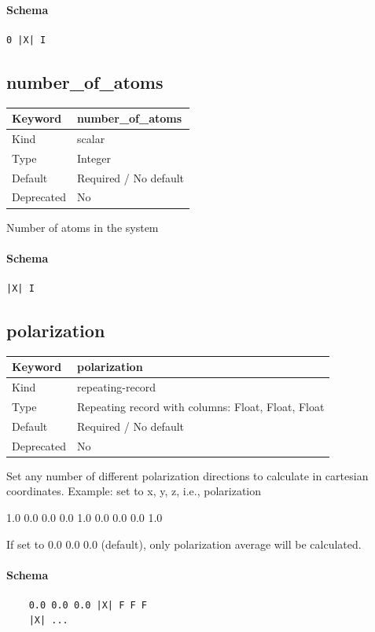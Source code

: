 \documentclass[11pt]{article}
\begin{document}
\paragraph{Schema}
\begin{Verbatim}
0 |X| I
\end{Verbatim}

\subsection{number\_of\_atoms}
\label{kw:number-of-atoms}
\begin{longtable}{|p{1.5in}|p{4.5in}|}
\hline
Keyword & number\_of\_atoms \\
\hline
Kind & scalar \\
\hline
Type & Integer \\
\hline
Default & Required / No default \\
\hline
Deprecated & No \\
\hline
\end{longtable}
 Number of atoms in the system

\paragraph{Schema}
\begin{Verbatim}
|X| I
\end{Verbatim}

\subsection{polarization}
\label{kw:polarization}
\begin{longtable}{|p{1.5in}|p{4.5in}|}
\hline
Keyword & polarization \\
\hline
Kind & repeating-record \\
\hline
Type & Repeating record with columns: Float, Float, Float \\
\hline
Default & Required / No default \\
\hline
Deprecated & No \\
\hline
\end{longtable}
 Set any number of different polarization directions to calculate in cartesian coordinates.
 Example: set to x, y, z, i.e.,
 polarization{
    1.0 0.0 0.0
    0.0 1.0 0.0
    0.0 0.0 1.0

 If set to 0.0 0.0 0.0 (default), only polarization average will be calculated.
}

\paragraph{Schema}
\begin{Verbatim}
    0.0 0.0 0.0 |X| F F F
    |X| ...
\end{Verbatim}
\end{document}
